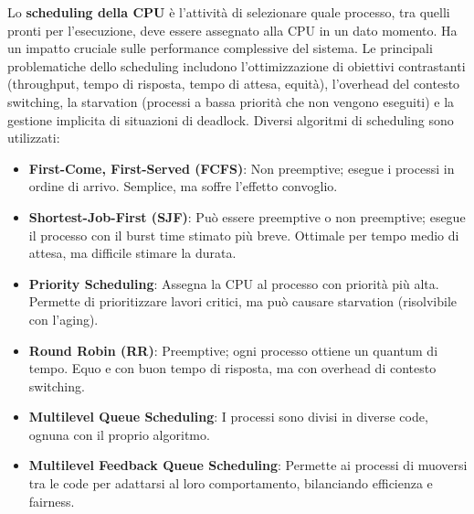 Lo \textbf{scheduling della CPU} è l'attività di selezionare quale processo, tra quelli pronti per l'esecuzione, deve essere assegnato alla CPU in un dato momento. Ha un impatto cruciale sulle performance complessive del sistema. Le principali problematiche dello scheduling includono l'ottimizzazione di obiettivi contrastanti (throughput, tempo di risposta, tempo di attesa, equità), l'overhead del contesto switching, la starvation (processi a bassa priorità che non vengono eseguiti) e la gestione implicita di situazioni di deadlock.
Diversi algoritmi di scheduling sono utilizzati:
\begin{itemize}
    \item \textbf{First-Come, First-Served (FCFS)}: Non preemptive; esegue i processi in ordine di arrivo. Semplice, ma soffre l'effetto convoglio.
    \item \textbf{Shortest-Job-First (SJF)}: Può essere preemptive o non preemptive; esegue il processo con il burst time stimato più breve. Ottimale per tempo medio di attesa, ma difficile stimare la durata.
    \item \textbf{Priority Scheduling}: Assegna la CPU al processo con priorità più alta. Permette di prioritizzare lavori critici, ma può causare starvation (risolvibile con l'aging).
    \item \textbf{Round Robin (RR)}: Preemptive; ogni processo ottiene un quantum di tempo. Equo e con buon tempo di risposta, ma con overhead di contesto switching.
    \item \textbf{Multilevel Queue Scheduling}: I processi sono divisi in diverse code, ognuna con il proprio algoritmo.
    \item \textbf{Multilevel Feedback Queue Scheduling}: Permette ai processi di muoversi tra le code per adattarsi al loro comportamento, bilanciando efficienza e fairness.
\end{itemize}
